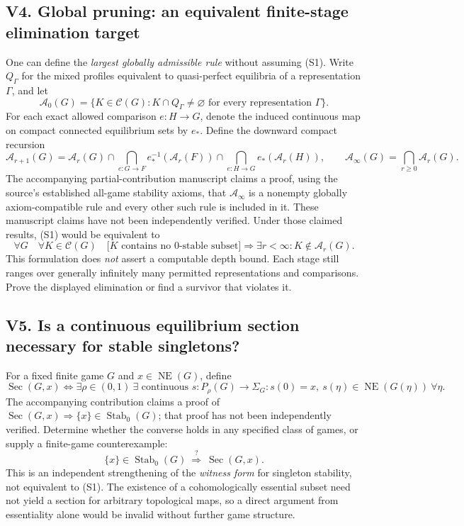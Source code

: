 \documentclass[11pt]{article}
\newcommand{\NE}{\operatorname{NE}}
\newcommand{\Stab}{\operatorname{Stab}_0}
\newcommand{\CC}{\mathcal C}
\newcommand{\A}{\mathcal A}
\begin{document}
\subsection*{V4. Global pruning: an equivalent finite-stage elimination target}
One can define the \emph{largest globally admissible rule} without
assuming (S1). Write $Q_\Gamma$ for the mixed profiles equivalent to
quasi-perfect equilibria of a representation $\Gamma$, and let
\[
 \A_0(G)=\{K\in\CC(G):K\cap Q_\Gamma\ne\varnothing
       \text{ for every representation }\Gamma\}.
\]
For each exact allowed comparison $e:H\to G$, denote the induced
continuous map on compact connected equilibrium sets by $e_*$.
Define the downward compact recursion
\[
 \A_{r+1}(G)=\A_r(G)
 \cap\bigcap_{e:G\to F}e_*^{-1}(\A_r(F))
 \cap\bigcap_{e:H\to G}e_*(\A_r(H)),
 \qquad
 \A_\infty(G)=\bigcap_{r\ge0}\A_r(G).
 \tag{4}\label{eq:prune}
\]
The accompanying partial-contribution manuscript claims a proof, using
the source's established all-game stability axioms, that $\A_\infty$
is a nonempty globally axiom-compatible rule and every other such
rule is included in it. These manuscript claims have not been independently
verified. Under those claimed results, (S1) would be equivalent to
\[
 \boxed{\forall G\quad \forall K\in\CC(G)\quad
 \bigl[K\text{ contains no }0\text{-stable subset}\bigr]
 \Longrightarrow\exists r<\infty: K\notin\A_r(G).}
 \tag{V4}\label{eq:V4}
\]
This formulation does \emph{not} assert a computable depth bound.
Each stage still ranges over generally infinitely many permitted
representations and comparisons. Prove the displayed elimination
or find a survivor that violates it.

\subsection*{V5. Is a continuous equilibrium section necessary for stable singletons?}
For a fixed finite game $G$ and $x\in\NE(G)$, define
\[
  \operatorname{Sec}(G,x)
  \iff
  \exists\rho\in(0,1)\ \exists\text{ continuous }s:P_\rho(G)\to\Sigma_G
  :s(0)=x,\ s(\eta)\in\NE(G(\eta))\ \forall\eta.
\]
The accompanying contribution claims a proof of
$\operatorname{Sec}(G,x)\Rightarrow\{x\}\in\Stab(G)$;
that proof has not been independently verified.
Determine whether the converse holds in any specified class of games,
or supply a finite-game counterexample:
\[
 \{x\}\in\Stab(G)\ \stackrel{?}{\Longrightarrow}\
 \operatorname{Sec}(G,x).
 \tag{V5}
\]
This is an independent strengthening of the \emph{witness form}
for singleton stability, not equivalent to (S1). The existence of a
cohomologically essential subset need not yield a section for arbitrary
topological maps, so a direct argument from essentiality alone would
be invalid without further game structure.
\end{document}

